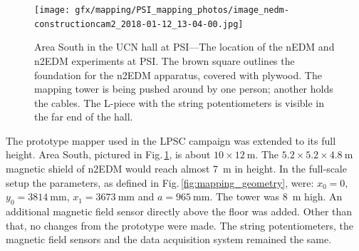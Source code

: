\begin{figure}
  \centering
  \texttt{[image: gfx/mapping/PSI\_mapping\_photos/image\_nedm-constructioncam2\_2018-01-12\_13-04-00.jpg]}
  \caption{Area South in the UCN hall at PSI---The location of the nEDM and n2EDM experiments at PSI\2.
  The brown square outlines the foundation for the n2EDM apparatus, covered with plywood. The mapping tower is being pushed around by one person; another holds the cables. The L-piece with the string potentiometers is visible in the far end of the hall.
  }\label{fig:mapping_photo}
\end{figure}

The prototype mapper used in the LPSC campaign was extended to its full height.
Area South, pictured in Fig.\,\ref{fig:mapping_photo}, is about $10 \times \SI{12}{\metre}$.
The $5.2 \times 5.2 \times \SI{4.8}{\metre}$ magnetic shield of n2EDM would reach almost \SI{7}{\metre} in height.
In the full-scale setup the parameters, as defined in Fig.\,\ref{fig:mapping_geometry}, were:
$x_0 = 0$, $y_0 = \SI{3814}{\milli\metre}$, $x_1 = \SI{3673}{\milli\metre}$ and $a = \SI{965}{\milli\metre}$.
The tower was \SI{8}{\metre} high.
An additional magnetic field sensor directly above the floor was added.
Other than that, no changes from the prototype were made.
The string potentiometers, the magnetic field sensors and the data acquisition system remained the same.

